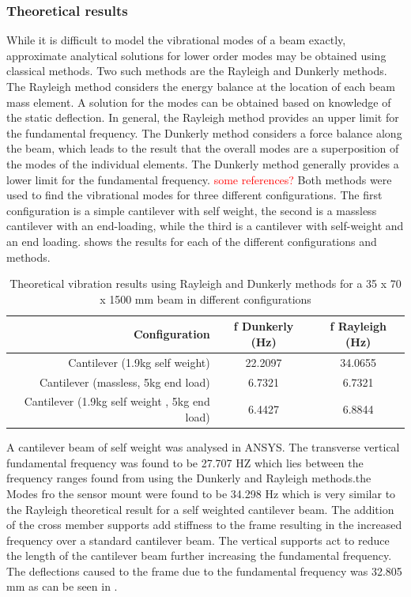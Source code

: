 \documentclass[main.tex]{subfiles}
\begin{document}
\subsubsection{Theoretical results}
While it is difficult to model the vibrational modes of a beam exactly, approximate analytical solutions for lower order modes may be obtained using classical methods. Two such methods are the Rayleigh and Dunkerly methods. The Rayleigh method considers the energy balance at the location of each beam mass element. A solution for the modes can be obtained based on knowledge of the static deflection. In general, the Rayleigh method provides an upper limit for the fundamental frequency. The Dunkerly method considers a force balance along the beam, which leads to the result that the overall modes are a superposition of the modes of the individual elements. The Dunkerly method generally provides a lower limit for the fundamental frequency.
\textcolor{red}{some references?}
Both methods were used to find the vibrational modes for three different configurations. The first configuration is a simple cantilever with self weight, the second is a massless cantilever with an end-loading, while the third is a cantilever with self-weight and an end loading.   shows the results for each of the different configurations and methods.



\begin{table} [ht]
\centering
\caption[Theoretical vibration results using Rayleigh and Dunkerly methods]{Theoretical vibration results using Rayleigh and Dunkerly methods for a 35 x 70 x 1500 mm beam in different configurations }
\begin{tabular} {r c c}
\toprule
Configuration & f Dunkerly (Hz) & f Rayleigh (Hz)  \\ \midrule
Cantilever (1.9kg self weight) & 22.2097 & 34.0655  \\
Cantilever (massless, 5kg end load) & 6.7321 & 6.7321 \\
Cantilever (1.9kg self weight , 5kg end load) & 6.4427 & 6.8844 \\ \bottomrule
\end{tabular}
\end{table}

A cantilever beam of self weight was analysed in ANSYS. The transverse vertical fundamental frequency was found to be 27.707 HZ which lies between the frequency ranges found from using the Dunkerly and Rayleigh methods.the Modes fro the sensor mount were found to be 34.298 Hz which is very similar to the Rayleigh theoretical result for a self weighted cantilever beam. The addition of the cross member supports add stiffness to the frame resulting in the increased frequency over a standard cantilever beam. The vertical supports act to reduce the length of the cantilever beam further increasing the fundamental frequency. The deflections caused to the frame due to the fundamental frequency was 32.805 mm as can be seen in . 
\end{document}
